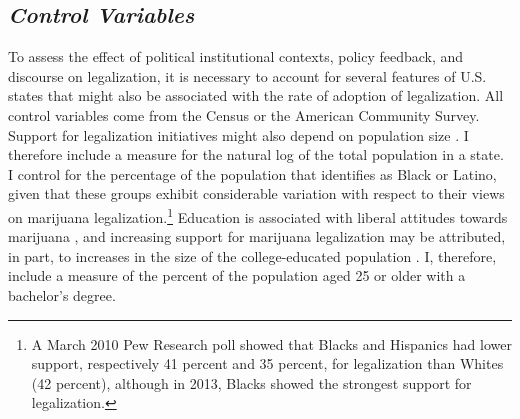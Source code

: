 

\subsection{\it{Control Variables}}

To assess the effect of political institutional contexts, policy feedback, and discourse on legalization, it is necessary to account for several features of U.S. states that might also be associated with the rate of adoption of legalization. All control variables come from the Census or the American Community Survey. %
Support for legalization initiatives might also depend on population size \citep{soule_and_olzak_2004,soule_and_king_2006,boushey_2016}. I therefore include a measure for the natural log of the total population in a state. I control for the percentage of the population that identifies as Black or Latino, given that these groups exhibit considerable variation with respect to their views on marijuana legalization.\footnote{A March 2010 Pew Research poll showed that Blacks and Hispanics had lower support, respectively 41 percent and 35 percent, for legalization than Whites (42 percent), although in 2013, Blacks showed the strongest support for legalization.} Education is associated with liberal attitudes towards marijuana \citep{pedersen_2009}, and increasing support for marijuana legalization may be attributed, in part, to increases in the size of the college-educated population \citep{rosenthal_and_kubby_1996}. I, therefore, include a measure of the percent of the population aged 25 or older with a bachelor's degree. %

